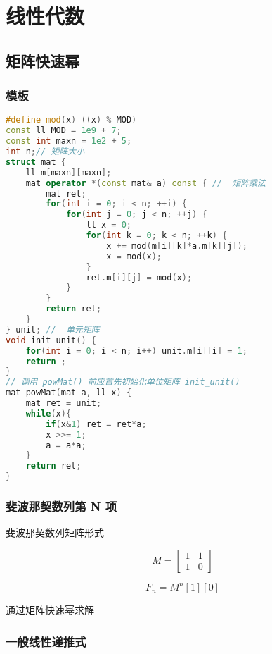 

\section{线性代数}

\subsection{矩阵快速幂}

\subsubsection{模板}

\begin{lstlisting}[language=C++]
#define mod(x) ((x) % MOD)
const ll MOD = 1e9 + 7;
const int maxn = 1e2 + 5;
int n;// 矩阵大小
struct mat {
    ll m[maxn][maxn];
    mat operator *(const mat& a) const { //  矩阵乘法
        mat ret;
        for(int i = 0; i < n; ++i) {
            for(int j = 0; j < n; ++j) {
                ll x = 0;
                for(int k = 0; k < n; ++k) {
                    x += mod(m[i][k]*a.m[k][j]);
                    x = mod(x);
                }
                ret.m[i][j] = mod(x);
            }
        }
        return ret;
    }
} unit; //  单元矩阵
void init_unit() {
    for(int i = 0; i < n; i++) unit.m[i][i] = 1;
    return ;
}
// 调用 powMat() 前应首先初始化单位矩阵 init_unit()
mat powMat(mat a, ll x) {
    mat ret = unit;
    while(x){
        if(x&1) ret = ret*a;
        x >>= 1;
        a = a*a;
    }
    return ret;
}
\end{lstlisting}

\subsubsection{斐波那契数列第 N 项}

斐波那契数列矩阵形式

$$
M =
\begin{bmatrix}
    1 & 1 \\
    1 & 0
\end{bmatrix}
$$

$$F_{n} = M^{n} [1][0]$$

通过矩阵快速幂求解

\subsubsection{一般线性递推式}

